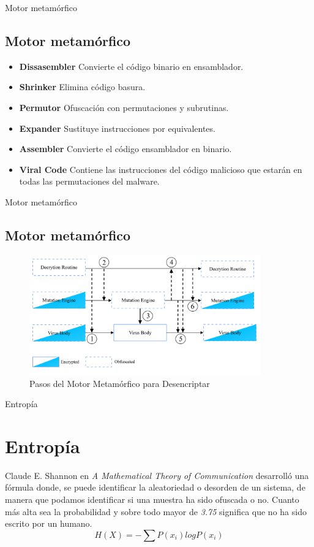 \documentclass[aspectratio=169]{beamer}
\begin{document}
	\begin{frame}{Motor metamórfico}
   	\subsection{Motor metamórfico}
		\begin{itemize}
			\item \textbf{Dissasembler} Convierte el código binario en ensamblador.    	
			\item \textbf{Shrinker} Elimina código basura.
			\item \textbf{Permutor} Ofuscación con permutaciones y subrutinas.
			\item \textbf{Expander} Sustituye instrucciones por equivalentes.
			\item \textbf{Assembler} Convierte el código ensamblador en binario.
			\item \textbf{Viral Code} Contiene las instrucciones del código malicioso que estarán en todas las permutaciones del malware.	
		\end{itemize}
	   	   	
	\end{frame}
	\begin{frame}{Motor metamórfico}
	\subsection{Motor metamórfico}
		\begin{figure}[H]
			\centering
			\includegraphics[width=10cm]{images/steps_metamorphic.png}
			\caption{Pasos del Motor Metamórfico para Desencriptar}
		\end{figure}
   	   	
  	\end{frame}
  
   \begin{frame}{Entropía}
   \section{Entropía}
   Claude E. Shannon en \textit{A Mathematical Theory of Communication} desarrolló una fórmula donde, se puede identificar la aleatoriedad o desorden de un sistema, de manera que podamos identificar si una muestra ha sido ofuscada o no. Cuanto más alta sea la probabilidad y sobre todo mayor de \textit{3.75} significa que no ha sido escrito por un humano.
  	\[H(X) = - \sum P (x_i) log P (x_i)\] 
  	
  
  \end{frame}
\end{document}
